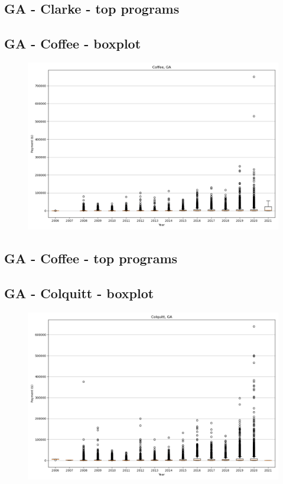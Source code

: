 \subsection*{GA - Clarke - top programs}

\newpage
\subsection*{GA - Coffee - boxplot}
\begin{figure}[h]
\centering
\includegraphics[width=7in]{../output/boxplots/counties/Coffee-GA_boxplot.png}
\end{figure}


\subsection*{GA - Coffee - top programs}

\newpage
\subsection*{GA - Colquitt - boxplot}
\begin{figure}[h]
\centering
\includegraphics[width=7in]{../output/boxplots/counties/Colquitt-GA_boxplot.png}
\end{figure}


